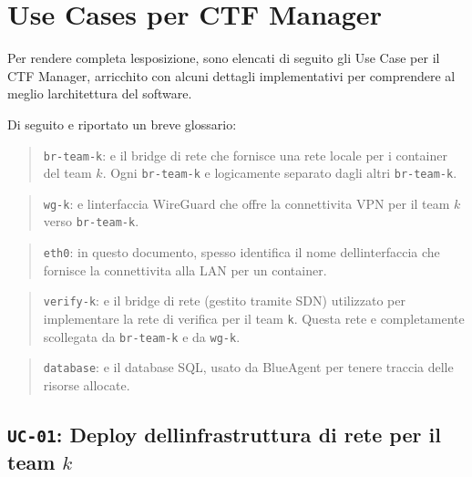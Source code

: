 \section{Use Cases per CTF Manager}\label{use-cases-per-ctf-manager}

Per rendere completa l\textquotesingle esposizione, sono elencati di
seguito gli Use Case per il CTF Manager, arricchito con alcuni dettagli
implementativi per comprendere al meglio l\textquotesingle architettura
del software.

Di seguito e\textquotesingle{} riportato un breve glossario:

\begin{quote}
\passthrough{\lstinline!br-team-k!}: e\textquotesingle{} il bridge di
rete che fornisce una rete locale per i container del team \(k\). Ogni
\passthrough{\lstinline!br-team-k!} e\textquotesingle{} logicamente
separato dagli altri \passthrough{\lstinline!br-team-k!}.
\end{quote}

\begin{quote}
\passthrough{\lstinline!wg-k!}: e\textquotesingle{}
l\textquotesingle interfaccia WireGuard che offre la connettivita VPN
per il team \(k\) verso \passthrough{\lstinline!br-team-k!}.
\end{quote}

\begin{quote}
\passthrough{\lstinline!eth0!}: in questo documento, spesso identifica
il nome dell\textquotesingle interfaccia che fornisce la connettivita
alla LAN per un container.
\end{quote}

\begin{quote}
\passthrough{\lstinline!verify-k!}: e\textquotesingle{} il bridge di
rete (gestito tramite SDN) utilizzato per implementare la rete di
verifica per il team \passthrough{\lstinline!k!}. Questa rete
e\textquotesingle{} completamente scollegata da
\passthrough{\lstinline!br-team-k!} e da \passthrough{\lstinline!wg-k!}.
\end{quote}

\begin{quote}
\passthrough{\lstinline!database!}: e\textquotesingle{} il database SQL,
usato da BlueAgent per tenere traccia delle risorse allocate.
\end{quote}

\subsection{\texorpdfstring{\texttt{UC-01}: Deploy
dell\textquotesingle infrastruttura di rete per il team
\(k\)}{UC-01: Deploy dell\textquotesingle infrastruttura di rete per il team k}}\label{uc-01-deploy-dellinfrastruttura-di-rete-per-il-team-k}

